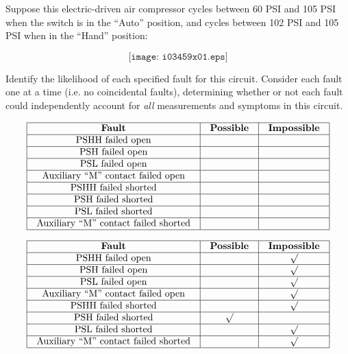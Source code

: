

Suppose this electric-driven air compressor cycles between 60 PSI and 105 PSI when the switch is in the ``Auto'' position, and cycles between 102 PSI and 105 PSI when in the ``Hand'' position:

$$\texttt{[image: i03459x01.eps]}$$

Identify the likelihood of each specified fault for this circuit.  Consider each fault one at a time (i.e. no coincidental faults), determining whether or not each fault could independently account for {\it all} measurements and symptoms in this circuit.


$$\vbox{\offinterlineskip
\halign{\strut
\vrule \quad\hfil # \ \hfil & 
\vrule \quad\hfil # \ \hfil & 
\vrule \quad\hfil # \ \hfil \vrule \cr
\noalign{\hrule}
%
{\bf Fault} & {\bf Possible} & {\bf Impossible} \cr
%
\noalign{\hrule}
%
PSHH failed open &  &  \cr
%
\noalign{\hrule}
%
PSH failed open &  &  \cr
%
\noalign{\hrule}
%
PSL failed open &  &  \cr
%
\noalign{\hrule}
%
Auxiliary ``M'' contact failed open &  &  \cr
%
\noalign{\hrule}
%
PSHH failed shorted &  &  \cr
%
\noalign{\hrule}
%
PSH failed shorted &  &  \cr
%
\noalign{\hrule}
%
PSL failed shorted &  &  \cr
%
\noalign{\hrule}
%
Auxiliary ``M'' contact failed shorted &  &  \cr
%
\noalign{\hrule}
} %
}$$ %








$$\vbox{\offinterlineskip
\halign{\strut
\vrule \quad\hfil # \ \hfil & 
\vrule \quad\hfil # \ \hfil & 
\vrule \quad\hfil # \ \hfil \vrule \cr
\noalign{\hrule}
%
{\bf Fault} & {\bf Possible} & {\bf Impossible} \cr
%
\noalign{\hrule}
%
PSHH failed open &  & $\surd$ \cr
%
\noalign{\hrule}
%
PSH failed open &  & $\surd$ \cr
%
\noalign{\hrule}
%
PSL failed open &  & $\surd$ \cr
%
\noalign{\hrule}
%
Auxiliary ``M'' contact failed open &  & $\surd$ \cr
%
\noalign{\hrule}
%
PSHH failed shorted &  & $\surd$ \cr
%
\noalign{\hrule}
%
PSH failed shorted & $\surd$ &  \cr
%
\noalign{\hrule}
%
PSL failed shorted &  & $\surd$ \cr
%
\noalign{\hrule}
%
Auxiliary ``M'' contact failed shorted &  & $\surd$ \cr
%
\noalign{\hrule}
} %
}$$ %


